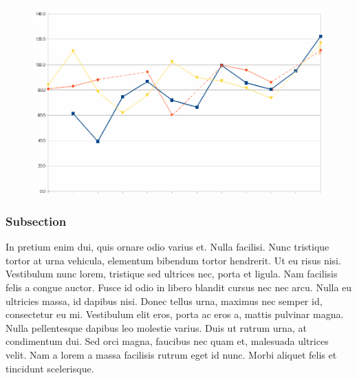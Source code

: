 \documentclass[10,a4paperpaper,]{article}
\begin{document}
\begin{figure}[htb]
  \centering
  \includegraphics[width=1\textwidth]{figures/figure1.png}
  \centering
\end{figure}

\subsubsection{Subsection}

In pretium enim dui, quis ornare odio varius et. Nulla facilisi. Nunc
tristique tortor at urna vehicula, elementum bibendum tortor hendrerit.
Ut eu risus nisi. Vestibulum nunc lorem, tristique sed ultrices nec,
porta et ligula. Nam facilisis felis a congue auctor. Fusce id odio in
libero blandit cursus nec nec arcu. Nulla eu ultricies massa, id dapibus
nisi. Donec tellus urna, maximus nec semper id, consectetur eu mi.
Vestibulum elit eros, porta ac eros a, mattis pulvinar magna. Nulla
pellentesque dapibus leo molestie varius. Duis ut rutrum urna, at
condimentum dui. Sed orci magna, faucibus nec quam et, malesuada
ultrices velit. Nam a lorem a massa facilisis rutrum eget id nunc. Morbi
aliquet felis et tincidunt scelerisque.
\end{document}

